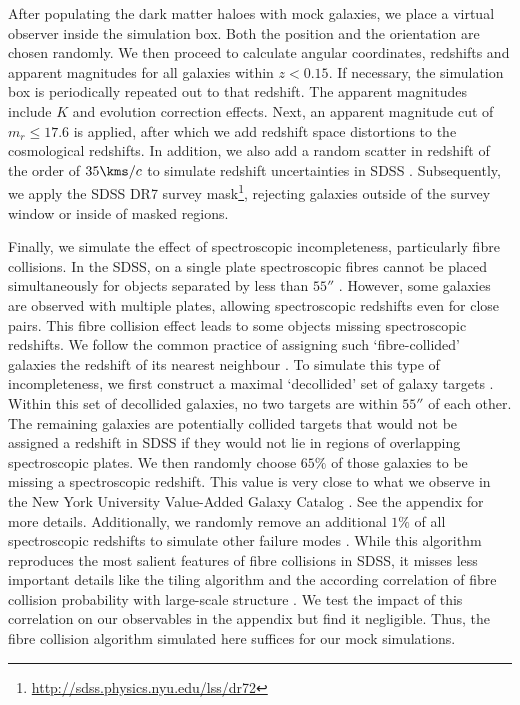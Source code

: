 \documentclass[fleqn,usenatbib,useAMS]{mnras}
\begin{document}
	After populating the dark matter haloes with mock galaxies, we place a virtual observer inside the simulation box. Both the position and the orientation are chosen randomly. We then proceed to calculate angular coordinates, redshifts and apparent magnitudes for all galaxies within $z < 0.15$. If necessary, the simulation box is periodically repeated out to that redshift. The apparent magnitudes include $K$ and evolution correction effects. Next, an apparent magnitude cut of $m_r \leq 17.6$ is applied, after which we add redshift space distortions to the cosmological redshifts. In addition, we also add a random scatter in redshift of the order of $35\kms / c$ to simulate redshift uncertainties in SDSS \citep{More+09b}. Subsequently, we apply the SDSS DR7 survey mask\footnote{\url{http://sdss.physics.nyu.edu/lss/dr72}}, rejecting galaxies outside of the survey window or inside of masked regions.
	
	Finally, we simulate the effect of spectroscopic incompleteness, particularly fibre collisions. In the SDSS, on a single plate spectroscopic fibres cannot be placed simultaneously for objects separated by less than $55''$ \citep{Blanton+03a}. However, some galaxies are observed with multiple plates, allowing spectroscopic redshifts even for close pairs. This fibre collision effect leads to some objects missing spectroscopic redshifts. We follow the common practice of assigning such `fibre-collided' galaxies the redshift of its nearest neighbour \citep[][]{Zehavi+05}. To simulate this type of incompleteness, we first construct a maximal `decollided' set of galaxy targets \citep{Blanton+03a}. Within this set of decollided galaxies, no two targets are within $55''$ of each other. The remaining galaxies are potentially collided targets that would not be assigned a redshift in SDSS if they would not lie in regions of overlapping spectroscopic plates. We then randomly choose $65\%$ of those galaxies to be missing a spectroscopic redshift. This value is very close to what we observe in the New York University Value-Added Galaxy Catalog \citep[VAGC;][]{Blanton+05}. See the appendix for more details. Additionally, we randomly remove an additional $1\%$ of all spectroscopic redshifts to simulate other failure modes \citep{Blanton+03a}. While this algorithm reproduces the most salient features of fibre collisions in SDSS, it misses less important details like the tiling algorithm and the according correlation of fibre collision probability with large-scale structure \citep{Blanton+03a}. We test the impact of this correlation on our observables in the appendix but find it negligible. Thus, the fibre collision algorithm simulated here suffices for our mock simulations.
	
\end{document}
